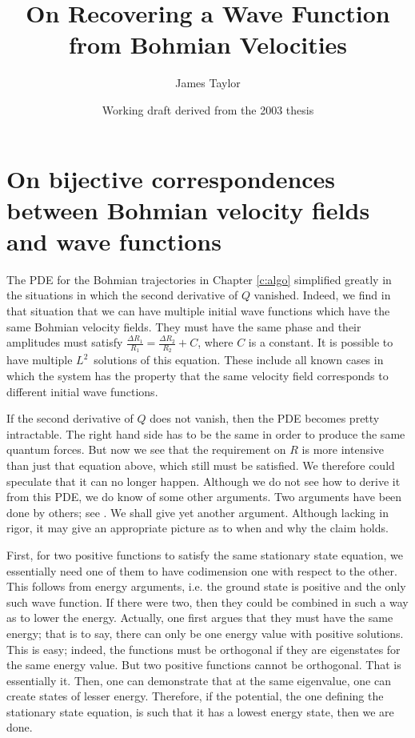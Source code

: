 \documentclass[11pt]{article}
\title{On Recovering a Wave Function from Bohmian Velocities}
\author{James Taylor}
\date{Working draft derived from the 2003 thesis}
\theoremstyle{remark}
\begin{document}
\maketitle

\section{On bijective 
correspondences between Bohmian velocity fields
  and wave functions} \label{a:ubvel}

The PDE for the Bohmian trajectories in Chapter \ref{c:algo}
 simplified greatly in
the situations in which the second derivative of $Q$ vanished.
 Indeed, we find in that situation that we can have
multiple initial wave functions which have the same Bohmian velocity
fields. They must have the same phase and their amplitudes must
satisfy $\frac{\ensuremath{\Delta} R_1}{R_1} = \frac{\ensuremath{\Delta} R_2}{R_2} +C$, where $C$ is a
 constant. It is possible to have multiple \ensuremath{L^{2}}\ solutions of this
 equation. These
include all  known cases in which the system has the
 property that the same velocity
field corresponds to different initial wave functions. 

If the second derivative of $Q$ does not vanish, then the PDE becomes
pretty intractable. The right hand side has to be the same in order to
produce the same quantum forces. But now we see that the requirement on
$R$ is more intensive
than just that equation above, which still must be satisfied. 
We therefore could speculate
that it can no longer happen. Although we do not see how to derive it
from this PDE, we do know of some other arguments. Two arguments have
been done by others; see \cite{S95, Bac03}. We shall give yet another
argument. Although lacking in rigor, it may give an appropriate
picture as to when and why the claim holds.


First, for two positive functions to satisfy the same stationary state
equation, we essentially need one of them to have codimension one with
respect to the other. This follows from energy arguments, i.e. the
ground state is positive and the only such wave function. If there were two,
then they could be combined in such a way as to lower the
energy. Actually, one first argues that they must have the same
energy; that is to say, there can only be one energy value with
positive solutions. This is easy; indeed, the functions must be
orthogonal if they are eigenstates for the same energy value. But two
positive functions cannot be orthogonal. That is essentially it. Then,
one can demonstrate that at the same eigenvalue, one can create states
of lesser energy. Therefore, if the potential, the one defining the stationary
state equation, is such that it has a
lowest energy state, then we are done.
\end{document}
